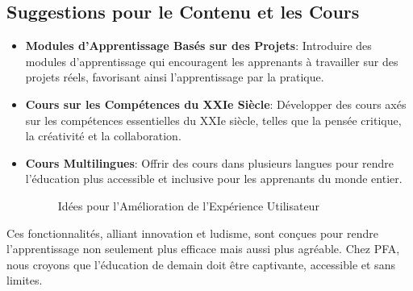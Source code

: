 \subsection{Suggestions pour le Contenu et les Cours}
\begin{itemize}[leftmargin=*,label=\textbullet,font=\color{violet}]
    
    \item \textbf{Modules d'Apprentissage Basés sur des Projets}: Introduire des modules d'apprentissage qui encouragent les apprenants à travailler sur des projets réels, favorisant ainsi l'apprentissage par la pratique.
    \item \textbf{Cours sur les Compétences du XXIe Siècle}: Développer des cours axés sur les compétences essentielles du XXIe siècle, telles que la pensée critique, la créativité et la collaboration.
    \item \textbf{Cours Multilingues}: Offrir des cours dans plusieurs langues pour rendre l'éducation plus accessible et inclusive pour les apprenants du monde entier.
    \begin{figure}[H]
        \centering
        \caption{Idées pour l'Amélioration de l'Expérience Utilisateur}
        \label{fig:ideas-tikz}
    \end{figure}

\end{itemize}

\begin{tcolorbox}[colback=yellow!20,colframe=black,width=\linewidth,arc=2mm,auto outer arc,
                  title=\textbf{Notre Vision:}]
Ces fonctionnalités, alliant innovation et ludisme, sont conçues pour rendre l'apprentissage non seulement plus efficace mais aussi plus agréable. Chez PFA, nous croyons que l'éducation de demain doit être captivante, accessible et sans limites.
\end{tcolorbox}
\vfill
